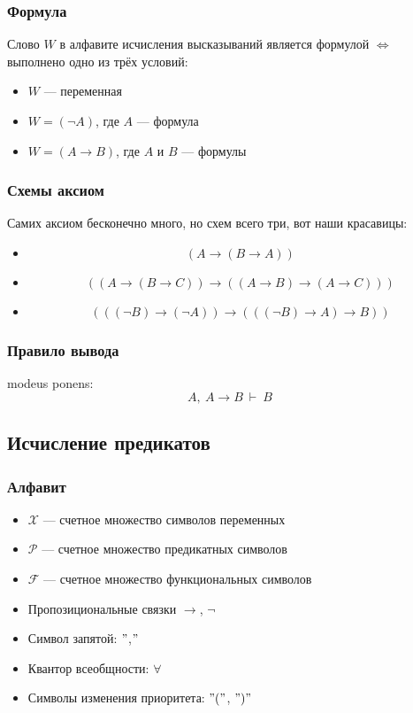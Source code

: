\documentclass[11pt]{article}
\begin{document}
\subsubsection*{Формула}

\begin{definition}
    Слово $W$ в алфавите исчисления высказываний является формулой $\Longleftrightarrow$
    выполнено одно из трёх условий:
    \begin{itemize}
        \item $W$ --- переменная
        \item $W = (\lnot A)$, где $A$ --- формула
        \item $W = (A \to B)$, где $A$ и $B$ --- формулы
    \end{itemize}
\end{definition}

\subsubsection*{Схемы аксиом}
Самих аксиом бесконечно много, но схем всего три, вот наши красавицы:

\begin{itemize}
    \item \[( A \to (B \to A))\]
    \item  \[\left( \left(A \to \left(B \to C\right) \right) \to \left( \left(A 
    \to B \right) \to \left(A \to C \right) \right) \right) \]
    \item \[\left( \left( \left( \lnot B \right) \to \left( \lnot A\right) \right)
    \to \left( \left( \left( \lnot B\right) \to A \right) \to B \right) \right)\]
\end{itemize}

\subsubsection*{Правило вывода}
modeus ponens:  \[ A, \ A \to B \ \vdash \ B\]

\subsection{Исчисление предикатов}

\subsubsection*{Алфавит}

\begin{itemize}
    \item $\mathcal{X}$ --- счетное множество символов переменных
    \item $\mathcal{P}$ --- счетное множество предикатных символов 
    \item $\mathcal{F}$ --- счетное множество функциональных символов 
    \item Пропозициональные связки $\rightarrow$, $\lnot$ 
    \item Символ запятой: $"${,}$"$
    \item Квантор всеобщности: $\forall$
    \item Символы изменения приоритета: $"("$, $")"$
\end{itemize}
\end{document}
